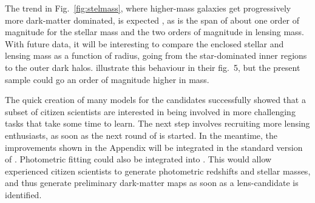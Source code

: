 The trend in Fig.~\ref{fig:stelmass}, where higher-mass galaxies get
progressively more dark-matter dominated, is expected
\citep[see, e.g.][]{2005ApJ...623L...5F}, as is the span of about one
order of magnitude for the stellar mass and the two orders of
magnitude in lensing mass. With future data, it will be interesting to
compare the enclosed stellar and lensing mass as a function of radius,
going from the star-dominated inner regions to the outer dark
halos. \citet{2011ApJ...740...97L} illustrate this behaviour in their
fig.~5, but the present sample could go an order of magnitude higher
in mass.

The quick creation of many models for the {\SW} candidates
successfully showed that a subset of citizen scientists are interested
in being involved in more challenging tasks that take some time to
learn. The next step involves recruiting more lensing enthusiasts, as
soon as the next round of {\SW} is started. In the meantime, the
improvements shown in the Appendix will be integrated in the standard
version of {\SpL}. Photometric fitting could also be
integrated into {\SpL}. This would allow experienced citizen
scientists to generate photometric redshifts and stellar masses, and
thus generate preliminary dark-matter maps as soon as a lens-candidate
is identified.

